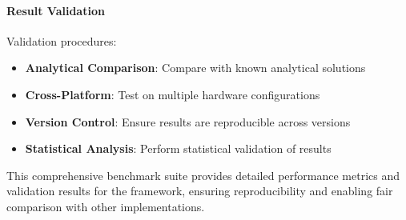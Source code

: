 \paragraph{Result Validation}
Validation procedures:

\begin{itemize}
    \item \textbf{Analytical Comparison}: Compare with known analytical solutions
    \item \textbf{Cross-Platform}: Test on multiple hardware configurations
    \item \textbf{Version Control}: Ensure results are reproducible across versions
    \item \textbf{Statistical Analysis}: Perform statistical validation of results
\end{itemize}

This comprehensive benchmark suite provides detailed performance metrics and validation results for the \hpfracc framework, ensuring reproducibility and enabling fair comparison with other implementations.
